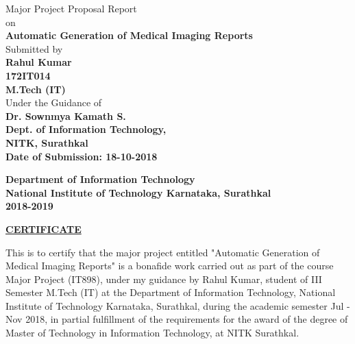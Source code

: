 \documentclass[12pt]{article}
\numberwithin{figure}{section}
\begin{document}
\thispagestyle{empty}
 \begin{center}
Major Project Proposal Report\\
\null
on\\
\null
\textbf{Automatic Generation of Medical Imaging Reports}\\
\null
Submitted by \\
\null
\textbf{Rahul Kumar}\\
\textbf{172IT014}\\
\textbf{M.Tech (IT)}\\
\null
Under the Guidance of\\
\textbf{Dr. Sownmya Kamath S.}  \\
\null
\textbf{Dept. of Information Technology,}\\
\textbf{NITK, Surathkal}\\
\null
\textbf{Date of Submission: 18-10-2018}\\
\begin{figure}[h] %
\end{figure}
\textbf{Department of Information Technology\\
National Institute of Technology Karnataka, Surathkal\\
2018-2019}\\
\end{center}
\clearpage
\thispagestyle{empty}
\begin{center}
\underline{\textbf{CERTIFICATE}} \\
\end{center}
\null
This is to certify that the major project entitled "Automatic Generation of Medical Imaging Reports" is a bonafide work carried out as part of the course Major Project (IT898), under my guidance by Rahul Kumar, student of III Semester M.Tech (IT) at the Department of Information Technology, National Institute of Technology Karnataka, Surathkal, during the academic semester Jul - Nov 2018, in partial fulfillment of the requirements for the award of the degree of Master of Technology in Information Technology, at NITK Surathkal. 
\end{document}
